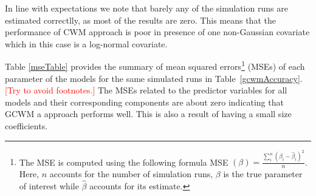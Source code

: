 \documentclass[11pt,letterpaper]{article}
\numberwithin{equation}{section}
\numberwithin{equation}{section}
\numberwithin{equation}{section}
\begin{document}
In line with expectations we note that barely any of the simulation runs are estimated correctlly, as most of the results are zero. This means that the performance of CWM approach is poor in presence of one non-Gaussian covariate which in this case is a log-normal covariate. 

Table \ref{mseTable} provides the summary of mean squared errors\footnote{The MSE is computed using the following formula MSE $(\beta) = \frac{\sum_i^n (\beta_i - \hat\beta_i ) ^2}{n}$. Here, $n$ accounts for the number of simulation runs, $\beta$ is the true parameter of interest while $\hat{\beta}$ accounts for its estimate.} (MSEs) of each parameter of the models for the same simulated runs in Table~\ref{gcwmAccuracy}. \textcolor{red}{[Try to avoid footnotes.]} The MSEs related to the predictor variables for all models and their corresponding components are about zero indicating that  GCWM a approach performs well. This is also a result of having a small size coefficients.
\end{document}
